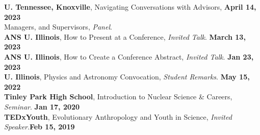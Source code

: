\documentclass[margin,line]{resume}
\begin{document}
\begin{resume}
    \textbf{U. Tennessee, Knoxville}, Navigating Conversations with Advisors,  \hfill\textbf{April 14, 2023}\\
    Managers, and Supervisors, \emph{Panel}.\\
    \textbf{ANS U. Illinois}, How to Present at a Conference, \emph{Invited Talk}.  \hfill\textbf{March 13, 2023}\\
    \textbf{ANS U. Illinois}, How to Create a Conference Abstract, \emph{Invited Talk}.  \hfill\textbf{Jan 23, 2023}\\
    \textbf{U. Illinois}, Physics and Astronomy Convocation, \emph{Student Remarks}.  \hfill\textbf{May 15, 2022}\\
    \textbf{Tinley Park High School}, Introduction to Nuclear Science \& Careers, \emph{Seminar}.  \hfill\textbf{Jan 17, 2020}\\
    \textbf{TEDxYouth}, Evolutionary Anthropology and Youth in Science, \emph{Invited Speaker}.\hfill\textbf{Feb 15, 2019}\\



\end{resume}
\end{document}
